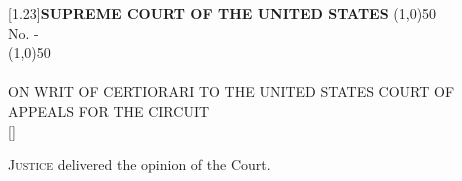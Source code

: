 \documentclass[letterpaper, twoside]{article}
\begin{document}
\begin{center}
    \fontsize{13.7}{16.44}\selectfont\scalebox{0.925}[1.23]{\textbf{SUPREME COURT OF THE UNITED STATES}}
    \line(1,0){50} \\ \vspace{5pt}
    \normalsize No. - \\
    \line(1,0){50} \\ \vspace{5pt}
    \fontsize{13.5}{16.2} \\ \vspace{10pt}
    \normalsize ON WRIT OF CERTIORARI TO THE UNITED STATES COURT OF APPEALS FOR THE  CIRCUIT \\ \vspace{10pt}
    []
\end{center}

\fontsize{12.5}{15}\selectfont

\textsc{Justice } delivered the opinion of the Court.\vspace{3pt}


\vspace{4pt}
\end{document}
